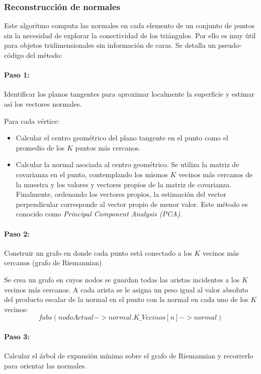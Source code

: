 \subsubsection{Reconstrucción de normales}

Este algoritmo computa las normales en cada elemento de un conjunto de puntos sin la necesidad de explorar la conectividad de los triángulos. Por ello es muy útil para objetos tridimensionales sin información de caras.
Se detalla un pseudo-código del método:

\paragraph{Paso 1: }Identificar los planos tangentes para aproximar localmente la superficie y estimar así los vectores normales.

Para cada vértice:
  \begin{itemize}
    \item Calcular el centro geométrico del plano tangente en el punto como el promedio de los $K$ puntos más cercanos.
    \item Calcular la normal asociada al centro geométrico. Se utiliza la matriz de covarianza en el punto, contemplando los mismos $K$ vecinos más cercanos de la muestra y los valores y vectores propios de la matriz de covarianza. Finalmente, ordenando los vectores propios, la estimación del vector perpendicular corresponde al vector propio de menor valor. Este método es conocido como \emph{Principal Component Analysis (PCA)}.
  \end{itemize}

\paragraph{Paso 2: }Construir un grafo en donde cada punto está conectado a los $K$ vecinos más cercanos (grafo de Riemannian)

Se crea un grafo en cuyos nodos se guardan todas las aristas incidentes a los $K$ vecinos más cercanos. A cada arista se le asigna un peso igual al valor absoluto del producto escalar de la normal en el punto con la normal en cada uno de los $K$ vecinos:
   $$fabs(nodoActual->normal . K\_Vecinos[n]->normal)$$
\paragraph{Paso 3: }Calcular el árbol de expansión mínimo sobre el grafo de Riemannian y recorrerlo para orientar las normales.

